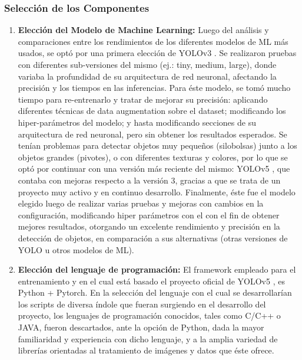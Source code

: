 \subsubsection{Selección de los Componentes}
\begin{enumerate}

    \item \textbf{Elección del Modelo de Machine Learning:} 
    Luego del análisis y comparaciones entre los rendimientos de los diferentes modelos de ML más usados, se optó por una primera elección de YOLOv3 \cite{yolov3}. Se realizaron pruebas con diferentes sub-versiones del mismo (ej.: tiny, medium, large), donde variaba la profundidad de su arquitectura de red neuronal, afectando la precisión y los tiempos en las inferencias. Para éste modelo, se tomó mucho tiempo para re-entrenarlo y tratar de mejorar su precisión: aplicando diferentes técnicas de data augmentation sobre el dataset; modificando los hiper-parámetros del modelo; y hasta modificando secciones de su arquitectura de red neuronal, pero sin obtener los resultados esperados. Se tenían problemas para detectar objetos muy pequeños (silobolsas) junto a los objetos grandes (pivotes), o con diferentes texturas y colores, por lo que se optó por continuar con una versión más reciente del mismo: YOLOv5 \cite{yolov5}, que contaba con mejoras respecto a la versión 3, gracias a que se trata de un proyecto muy activo y en continuo desarrollo. Finalmente, éste fue el modelo elegido luego de realizar varias pruebas y mejoras con cambios en la configuración, modificando hiper parámetros con el con el fin de obtener mejores resultados, otorgando un excelente rendimiento y precisión en la detección de objetos, en comparación a sus alternativas (otras versiones de YOLO u otros modelos de ML).
    
    \item \textbf{Elección del lenguaje de programación:} El framework empleado para el entrenamiento y en el cual está basado el proyecto oficial de YOLOv5 \cite{yolov5}, es Python + Pytorch. En la selección del lenguaje con el cual se desarrollarían los scripts de diversa índole que fueran surgiendo en el desarrollo del proyecto, los lenguajes de programación conocidos, tales como C/C++ o JAVA, fueron descartados, ante la opción de Python, dada la mayor familiaridad y experiencia con dicho lenguaje, y a la amplia variedad de librerías orientadas al tratamiento de imágenes y datos que éste ofrece.
    

\end{enumerate}
